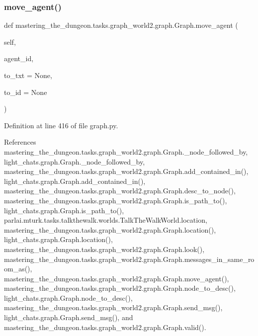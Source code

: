\subsubsection{\texorpdfstring{move\+\_\+agent()}{move\_agent()}}
{\footnotesize\ttfamily def mastering\+\_\+the\+\_\+dungeon.\+tasks.\+graph\+\_\+world2.\+graph.\+Graph.\+move\+\_\+agent (\begin{DoxyParamCaption}\item[{}]{self,  }\item[{}]{agent\+\_\+id,  }\item[{}]{to\+\_\+txt = {\ttfamily None},  }\item[{}]{to\+\_\+id = {\ttfamily None} }\end{DoxyParamCaption})}



Definition at line 416 of file graph.\+py.



References mastering\+\_\+the\+\_\+dungeon.\+tasks.\+graph\+\_\+world2.\+graph.\+Graph.\+\_\+node\+\_\+followed\+\_\+by, light\+\_\+chats.\+graph.\+Graph.\+\_\+node\+\_\+followed\+\_\+by, mastering\+\_\+the\+\_\+dungeon.\+tasks.\+graph\+\_\+world2.\+graph.\+Graph.\+add\+\_\+contained\+\_\+in(), light\+\_\+chats.\+graph.\+Graph.\+add\+\_\+contained\+\_\+in(), mastering\+\_\+the\+\_\+dungeon.\+tasks.\+graph\+\_\+world2.\+graph.\+Graph.\+desc\+\_\+to\+\_\+node(), mastering\+\_\+the\+\_\+dungeon.\+tasks.\+graph\+\_\+world2.\+graph.\+Graph.\+is\+\_\+path\+\_\+to(), light\+\_\+chats.\+graph.\+Graph.\+is\+\_\+path\+\_\+to(), parlai.\+mturk.\+tasks.\+talkthewalk.\+worlds.\+Talk\+The\+Walk\+World.\+location, mastering\+\_\+the\+\_\+dungeon.\+tasks.\+graph\+\_\+world2.\+graph.\+Graph.\+location(), light\+\_\+chats.\+graph.\+Graph.\+location(), mastering\+\_\+the\+\_\+dungeon.\+tasks.\+graph\+\_\+world2.\+graph.\+Graph.\+look(), mastering\+\_\+the\+\_\+dungeon.\+tasks.\+graph\+\_\+world2.\+graph.\+Graph.\+messages\+\_\+in\+\_\+same\+\_\+room\+\_\+as(), mastering\+\_\+the\+\_\+dungeon.\+tasks.\+graph\+\_\+world2.\+graph.\+Graph.\+move\+\_\+agent(), mastering\+\_\+the\+\_\+dungeon.\+tasks.\+graph\+\_\+world2.\+graph.\+Graph.\+node\+\_\+to\+\_\+desc(), light\+\_\+chats.\+graph.\+Graph.\+node\+\_\+to\+\_\+desc(), mastering\+\_\+the\+\_\+dungeon.\+tasks.\+graph\+\_\+world2.\+graph.\+Graph.\+send\+\_\+msg(), light\+\_\+chats.\+graph.\+Graph.\+send\+\_\+msg(), and mastering\+\_\+the\+\_\+dungeon.\+tasks.\+graph\+\_\+world2.\+graph.\+Graph.\+valid().



